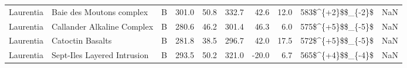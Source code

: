 \begin{longtable}{p{1 in}p{1 in}rrrrrrr}
                     Laurentia &                           Baie des Moutons complex &      B &     301.0 &      50.8 & 332.7 &  42.6 &      12.0 &      583\$\textasciicircum \{+2\}\$\$\_\{-2\}\$ &                                                NaN \\
                     Laurentia &                         Callander Alkaline Complex &      B &     280.6 &      46.2 & 301.4 &  46.3 &       6.0 &      575\$\textasciicircum \{+5\}\$\$\_\{-5\}\$ &                                                NaN \\
                     Laurentia &                                   Catoctin Basalts &      B &     281.8 &      38.5 & 296.7 &  42.0 &      17.5 &      572\$\textasciicircum \{+5\}\$\$\_\{-5\}\$ &                                                NaN \\
                     Laurentia &                        Sept-Iles Layered Intrusion &      B &     293.5 &      50.2 & 321.0 & -20.0 &       6.7 &      565\$\textasciicircum \{+4\}\$\$\_\{-4\}\$ &                                                NaN \\
\end{longtable}

